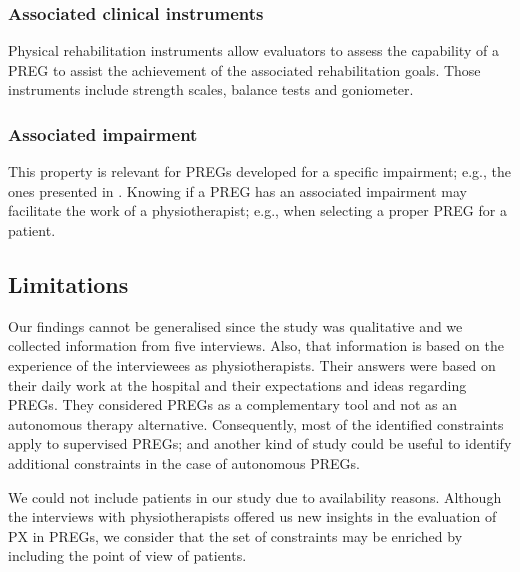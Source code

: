 \subsubsection{Associated clinical instruments}
Physical rehabilitation instruments allow evaluators to assess the capability of a \ac{PREG} to assist the achievement of the associated rehabilitation goals. Those instruments include strength scales, balance tests and goniometer.

\subsubsection{Associated impairment}
This property is relevant for \acp{PREG} developed for a specific impairment; e.g., the ones presented in \autocite{Brokaw2015,Ni2014}. Knowing if a \ac{PREG} has an associated impairment may facilitate the work of a physiotherapist; e.g., when selecting a proper \ac{PREG} for a patient.

\subsection{Limitations}
Our findings cannot be generalised since the study was qualitative and we collected information from five interviews. Also, that information is based on the experience of the interviewees as physiotherapists. Their answers were based on their daily work at the hospital and their expectations and ideas regarding \acp{PREG}. They considered \acp{PREG} as a complementary tool and not as an autonomous therapy alternative. Consequently, most of the identified constraints apply to supervised \acp{PREG}; and another kind of study could be useful to identify additional constraints in the case of autonomous \acp{PREG}.

We could not include patients in our study due to availability reasons. Although the interviews with physiotherapists offered us new insights in the evaluation of \ac{PX} in \acp{PREG}, we consider that the set of constraints may be enriched by including the point of view of patients.

